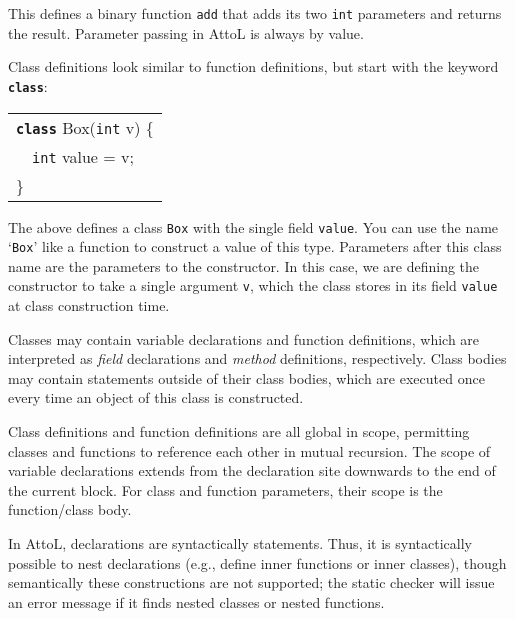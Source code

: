 \documentclass[11pt,a4paper]{article}
\newenvironment{slisting}{%
        \begin{tt}%
        \begin{tabular}{l}%
        }
        {%
        \end{tabular}%
        \end{tt}%
        }
\newcommand{\Cty}[1]{\textcolor{dblue}{\texttt{#1}}}
\newcommand{\Ckw}[1]{\textbf{\texttt{#1}}}
\begin{document}
This defines a binary function \texttt{add} that adds its two
\Cty{int} parameters and returns the result.
Parameter passing in AttoL is always by value.

Class definitions look similar to function definitions, but start with the keyword \Ckw{class}:

\begin{slisting}
\Ckw{class} Box(\Cty{int} v) \{\\
\ \ \Cty{int} value = v;\\
\}\\
\end{slisting}

The above defines a class \Cty{Box} with the single field \texttt{value}.  You can use the name `\Cty{Box}'
like a function to construct a value of this type.  Parameters after this class name are
the parameters to the constructor.  In this case, we are defining the constructor to take a single
argument \texttt{v}, which the class stores in its field \texttt{value} at class construction time.

Classes may contain variable declarations and function definitions,
which are interpreted as \emph{field} declarations and \emph{method}
definitions, respectively.  Class bodies may contain statements
outside of their class bodies, which are executed once every time an
object of this class is constructed.

Class definitions and function definitions are all global in scope,
permitting classes and functions to reference each other in mutual
recursion.  The scope of variable declarations extends from the
declaration site downwards to the end of the current block.  For class
and function parameters, their scope is the function/class body.

In AttoL, declarations are syntactically statements.  Thus, it is
syntactically possible to nest declarations (e.g., define inner
functions or inner classes), though semantically these constructions
are not supported; the static checker will issue an error message if
it finds nested classes or nested functions.
\end{document}

